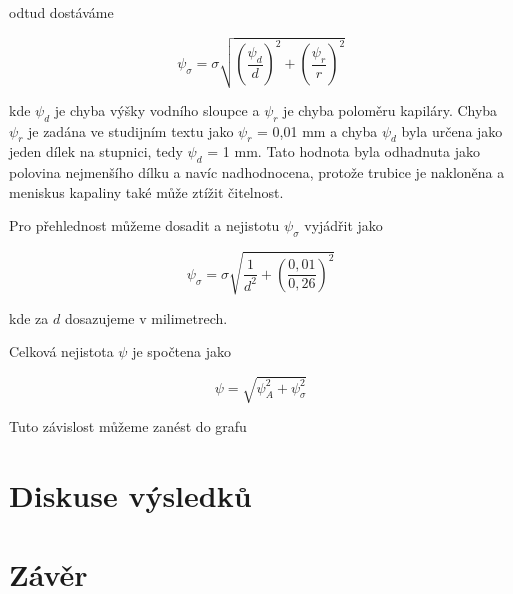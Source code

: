 \newpage

odtud dostáváme

\begin{equation}
    \psi_{\sigma} = \sigma \sqrt{\left( \frac{\psi_d}{d} \right)^2 + \left( \frac{\psi_r}{r} \right)^2}
\end{equation}

kde $\psi_d$ je chyba výšky vodního sloupce a $\psi_r$ je chyba poloměru kapiláry. Chyba $\psi_r$ je zadána ve studijním textu jako $\psi_r$ = 0,01 mm a chyba $\psi_d$ byla určena jako jeden dílek na stupnici, tedy $\psi_d$ = 1 mm. Tato hodnota byla odhadnuta jako polovina nejmenšího dílku a navíc nadhodnocena, protože trubice je nakloněna a meniskus kapaliny také může ztížit čitelnost.

Pro přehlednost můžeme dosadit a nejistotu $\psi_\sigma$ vyjádřit jako

\begin{equation}
    \psi_\sigma = \sigma \sqrt{\frac{1}{d^2} + \left( \frac{0,01}{0,26} \right)^2}
\end{equation}

kde za $d$ dosazujeme v milimetrech.

Celková nejistota $\psi$ je spočtena jako

\begin{equation}
    \psi = \sqrt{\psi^2_A + \psi^2_{\sigma}}
\end{equation}

Tuto závislost můžeme zanést do grafu



\section{Diskuse výsledků}

\section{Závěr}
